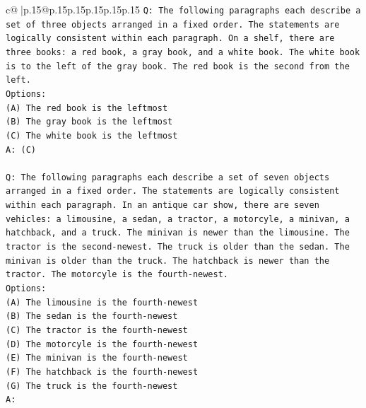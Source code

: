 \documentclass{article}
\begin{document}
{\begin{supertabular}{c@{$\;$}|p{.15\linewidth}@{}p{.15\linewidth}p{.15\linewidth}p{.15\linewidth}p{.15\linewidth}p{.15\linewidth}}
{{{\texttt{Q: The following paragraphs each describe a set of three objects arranged in a fixed order. The statements are logically consistent within each paragraph. On a shelf, there are three books: a red book, a gray book, and a white book. The white book is to the left of the gray book. The red book is the second from the left.} \\
\texttt{Options:} \\
\texttt{(A) The red book is the leftmost} \\
\texttt{(B) The gray book is the leftmost} \\
\texttt{(C) The white book is the leftmost} \\
\texttt{A: (C)} \\
\\ 
\texttt{Q: The following paragraphs each describe a set of seven objects arranged in a fixed order. The statements are logically consistent within each paragraph. In an antique car show, there are seven vehicles: a limousine, a sedan, a tractor, a motorcyle, a minivan, a hatchback, and a truck. The minivan is newer than the limousine. The tractor is the second{-}newest. The truck is older than the sedan. The minivan is older than the truck. The hatchback is newer than the tractor. The motorcyle is the fourth{-}newest.} \\
\texttt{Options:} \\
\texttt{(A) The limousine is the fourth{-}newest} \\
\texttt{(B) The sedan is the fourth{-}newest} \\
\texttt{(C) The tractor is the fourth{-}newest} \\
\texttt{(D) The motorcyle is the fourth{-}newest} \\
\texttt{(E) The minivan is the fourth{-}newest} \\
\texttt{(F) The hatchback is the fourth{-}newest} \\
\texttt{(G) The truck is the fourth{-}newest} \\
\texttt{A:} \\
            }
        }
    }
     \\ \\


\end{supertabular}}
\end{document}
